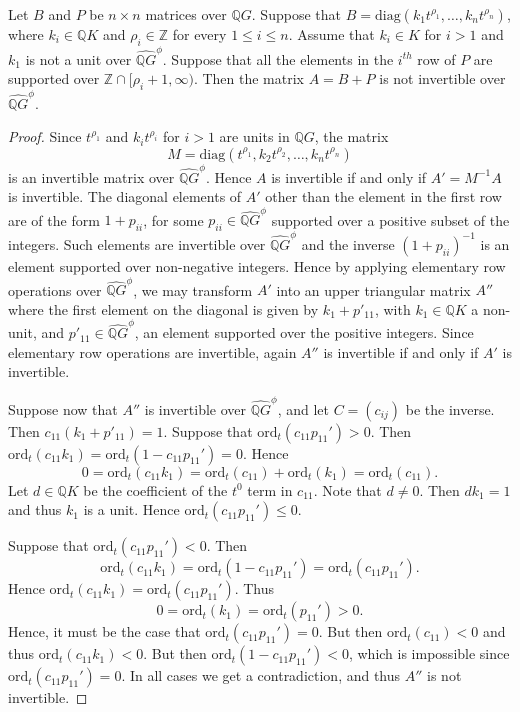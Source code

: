 \begin{lemma}\label{invertibility}
Let $B$ and $P$ be $n \times n$ matrices over $\mathbb{Q}G$. Suppose that $B = \mathrm{diag}(k_1t^{\rho_1}, \ldots, k_nt^{\rho_n})$, where $k_i \in \mathbb{Q}K$ and $\rho_i \in \mathbb{Z}$ for every $1 \leq i \leq n$. Assume that $k_i \in K$ for $i > 1$ and $k_1$ is not a unit over $\widehat{\mathbb{Q}G}^{\phi}$. Suppose that all the elements in the $i^{th}$ row of $P$ are supported over $\mathbb{Z} \cap [\rho_{i} + 1, \infty)$. Then the matrix $A = B+ P$ is not invertible over $\widehat{\mathbb{Q}G}^{\phi}$.
\end{lemma}
\begin{proof}
Since $t^{\rho_1}$ and $k_it^{\rho_i}$ for $i > 1$ are units in $\mathbb{Q}G$, the matrix \[M = \mathrm{diag}(t^{\rho_1}, k_2t^{\rho_2},  \ldots, k_nt^{\rho_n})\] is an invertible matrix over $\widehat{\mathbb{Q}G}^{\phi}$. Hence $A$ is invertible if and only if $A' = M^{-1}A$ is invertible. The diagonal elements of $A'$ other than the element in the first row are of the form $1 + p_{ii}$, for some $p_{ii} \in \widehat{\mathbb{Q}G}^{\phi}$ supported over a positive subset of the integers. Such elements are invertible over $\widehat{\mathbb{Q}G}^{\phi}$ and the inverse $(1+ p_{ii})^{-1}$ is an element supported over non-negative integers. Hence by applying elementary row operations over $\widehat{\mathbb{Q}G}^{\phi}$, we may transform $A'$ into an upper triangular matrix $A''$ where the first element on the diagonal is given by $k_1 + p'_{11}$, with $k_1 \in \mathbb{Q}K$ a non-unit, and $p'_{11} \in \widehat{\mathbb{Q}G}^{\phi}$, an element supported over the positive integers.  Since elementary row operations are invertible, again $A''$ is invertible if and only if $A'$ is invertible. 

Suppose now that $A''$ is invertible over $\widehat{\mathbb{Q}G}^{\phi}$, and let $C = (c_{ij})$ be the inverse. Then $c_{11}(k_1 + p'_{11}) = 1$. Suppose that $\mathrm{ord}_t(c_{11}p_{11}') > 0$. Then $\mathrm{ord}_t(c_{11}k_1) = \mathrm{ord}_t(1 - c_{11}p_{11}') = 0$. Hence \[ 0 = \mathrm{ord}_t(c_{11} k_1) = \mathrm{ord}_t(c_{11}) + \mathrm{ord}_t(k_1) = \mathrm{ord}_t(c_{11}).\] Let $d \in \mathbb{Q}K$ be the coefficient of the $t^0$ term in $c_{11}$. Note that $d \neq 0$. Then $dk_{1} = 1$ and thus $k_1$ is a unit. Hence $\mathrm{ord}_t(c_{11}p_{11}') \leq 0$.

Suppose that $\mathrm{ord}_t(c_{11}p_{11}') < 0$. Then \[\mathrm{ord}_t(c_{11}k_1) = \mathrm{ord}_t(1 - c_{11}p_{11}') = \mathrm{ord}_t(c_{11}p_{11}').\]
Hence $\mathrm{ord}_t(c_{11}k_1) = \mathrm{ord}_t(c_{11}p_{11}')$. Thus \[0 = \mathrm{ord}_t(k_1) = \mathrm{ord}_t(p_{11}') >0.\] 
Hence, it must be the case that $\mathrm{ord}_t(c_{11}p_{11}') = 0$. But then $\mathrm{ord}_t(c_{11}) < 0$ and thus $\mathrm{ord}_t(c_{11}k_1) < 0$. But then $\mathrm{ord}_t(1 - c_{11}p_{11}') < 0$, which is impossible since $\mathrm{ord}_t(c_{11}p_{11}') = 0$. In all cases we get a contradiction, and thus $A''$ is not invertible.\end{proof}

